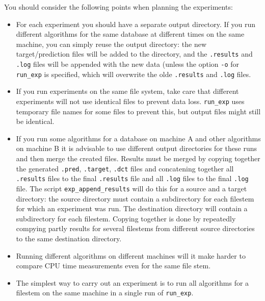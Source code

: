\documentclass[a4paper,10pt,twoside]{article}
\begin{document}
You should consider the following points when planning the experiments:
\begin{itemize}
\item For each experiment  you should have a separate output directory.
If you run different algorithms for the same database at different times
on the same machine, you can simply reuse the output directory: the
new target/prediction files will be added to the directory, and the 
\texttt{.results} and \texttt{.log} files will be appended with the
new data (unless the option \texttt{-o} for \verb=run_exp= is specified, which 
will overwrite the olde \texttt{.results} and \texttt{.log} files.
\item If you run experiments on the same file system, take care that
different experiments will not use identical files to prevent data loss.
\verb=run_exp= uses temporary file names for some files to prevent this,
but output files might still be identical.
\item If you run some algorithms for a database on machine A and 
other algorithms on machine B it is advisable to use different
output directories for these runs and then merge the created files.
Results must be merged by copying together the generated \texttt{.pred},
\texttt{.target}, \texttt{.dct} files and concatening together
 all \texttt{.results} files to the final \texttt{.results} file and 
all \texttt{.log} files to the final \texttt{.log} file.
The script \verb=exp_append_results= will do this for a
source and a target directory: the source directory must contain
a subdirectory for each filestem for which an experiment was run.
The destination directory will contain a subdirectory for each filestem.
Copying together is done by repeatedly compying partly results for several
filestems from different source directories to the same 
destination directory.
\item Running different algorithms on different machines will it make
harder to compare CPU time measurements even for the same file stem.
\item The simplest way to carry out an experiment is to run
all  algorithms for a filestem on the same machine in a single run
of \verb=run_exp=.
\end{itemize}


\end{document}
